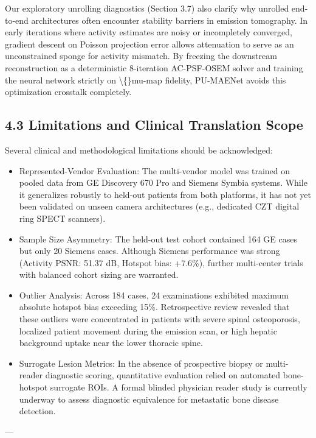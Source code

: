 \documentclass[11pt]{article}
\begin{document}
Our exploratory unrolling diagnostics (Section 3.7) also clarify why unrolled end-to-end architectures often encounter stability barriers in emission tomography. In early iterations where activity estimates are noisy or incompletely converged, gradient descent on Poisson projection error allows attenuation to serve as an unconstrained sponge for activity mismatch. By freezing the downstream reconstruction as a deterministic 8-iteration AC-PSF-OSEM solver and training the neural network strictly on \textbackslash\{\}mu-map fidelity, PU-MAENet avoids this optimization crosstalk completely.\par

\subsection*{4.3 Limitations and Clinical Translation Scope}
Several clinical and methodological limitations should be acknowledged:\par

\begin{itemize}\item  Represented-Vendor Evaluation: The multi-vendor model was trained on pooled data from GE Discovery 670 Pro and Siemens Symbia systems. While it generalizes robustly to held-out patients from both platforms, it has not yet been validated on unseen camera architectures (e.g., dedicated CZT digital ring SPECT scanners).\end{itemize}
\begin{itemize}\item  Sample Size Asymmetry: The held-out test cohort contained 164 GE cases but only 20 Siemens cases. Although Siemens performance was strong (Activity PSNR: 51.37 dB, Hotspot bias: +7.6\%), further multi-center trials with balanced cohort sizing are warranted.\end{itemize}
\begin{itemize}\item  Outlier Analysis: Across 184 cases, 24 examinations exhibited maximum absolute hotspot bias exceeding 15\%. Retrospective review revealed that these outliers were concentrated in patients with severe spinal osteoporosis, localized patient movement during the emission scan, or high hepatic background uptake near the lower thoracic spine.\end{itemize}
\begin{itemize}\item  Surrogate Lesion Metrics: In the absence of prospective biopsy or multi-reader diagnostic scoring, quantitative evaluation relied on automated bone-hotspot surrogate ROIs. A formal blinded physician reader study is currently underway to assess diagnostic equivalence for metastatic bone disease detection.\end{itemize}
---\par
\end{document}
